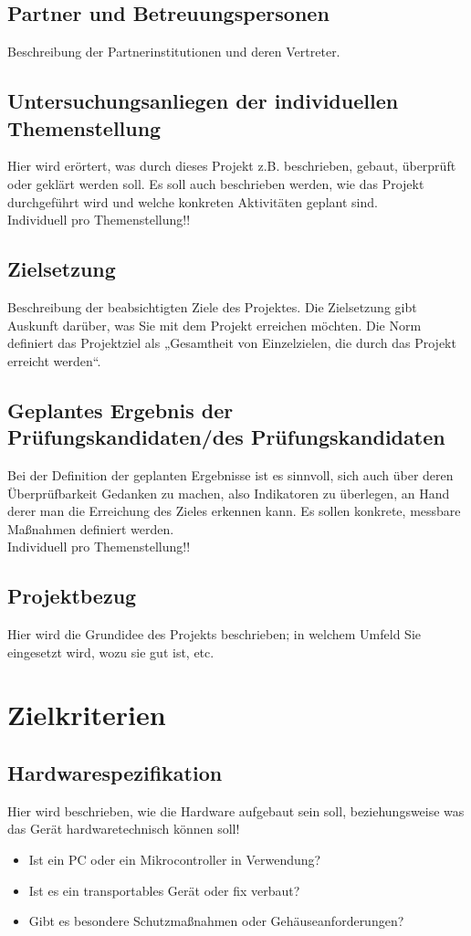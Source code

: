 \documentclass[12pt, draft]{article}
\begin{document}
\subsection{Partner und Betreuungspersonen}
Beschreibung der Partnerinstitutionen und deren Vertreter.

\subsection{Untersuchungsanliegen der individuellen Themenstellung}
Hier wird erörtert, was durch dieses Projekt z.B. beschrieben, gebaut, überprüft oder geklärt werden soll.
Es soll auch beschrieben werden, wie das Projekt durchgeführt wird und welche konkreten Aktivitäten geplant sind. \\
Individuell pro Themenstellung!!

\subsection{Zielsetzung}
Beschreibung der beabsichtigten Ziele des Projektes.
Die Zielsetzung gibt Auskunft darüber, was Sie mit dem Projekt erreichen möchten.
Die Norm definiert das Projektziel als „Gesamtheit von Einzelzielen, die durch das Projekt erreicht werden“.

\subsection{Geplantes Ergebnis der Prüfungskandidaten/des Prüfungskandidaten}
Bei der Definition der geplanten Ergebnisse ist es sinnvoll, sich auch über deren Überprüfbarkeit Gedanken zu machen, also Indikatoren zu überlegen, an Hand derer man die Erreichung des Zieles erkennen kann.
Es sollen konkrete, messbare Maßnahmen definiert werden. \\
Individuell pro Themenstellung!!

\subsection{Projektbezug}
Hier wird die Grundidee des Projekts beschrieben;
in welchem Umfeld Sie eingesetzt wird, wozu sie gut ist, etc.

\section{Zielkriterien}
\subsection{Hardwarespezifikation}
Hier wird beschrieben, wie die Hardware aufgebaut sein soll, beziehungsweise was das Gerät hardwaretechnisch können soll!
\begin{itemize}
    \item Ist ein PC oder ein Mikrocontroller in Verwendung?
    \item Ist es ein transportables Gerät oder fix verbaut?
    \item Gibt es besondere Schutzmaßnahmen oder Gehäuseanforderungen?
\end{itemize}
\end{document}
